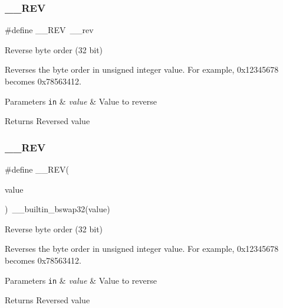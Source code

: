 \subsubsection{\texorpdfstring{\+\_\+\+\_\+\+R\+EV}{\_\_REV}\hspace{0.1cm}{\footnotesize\ttfamily [1/2]}}
{\footnotesize\ttfamily \#define \+\_\+\+\_\+\+R\+EV~\+\_\+\+\_\+rev}



Reverse byte order (32 bit) 

Reverses the byte order in unsigned integer value. For example, 0x12345678 becomes 0x78563412. 
\begin{DoxyParams}[1]{Parameters}
\mbox{\tt in}  & {\em value} & Value to reverse \\
\hline
\end{DoxyParams}
\begin{DoxyReturn}{Returns}
Reversed value 
\end{DoxyReturn}
\mbox{\label{group___c_m_s_i_s___core___instruction_interface_gaca25a02e09983da5558f5242f2f635bc}} 
\subsubsection{\texorpdfstring{\+\_\+\+\_\+\+R\+EV}{\_\_REV}\hspace{0.1cm}{\footnotesize\ttfamily [2/2]}}
{\footnotesize\ttfamily \#define \+\_\+\+\_\+\+R\+EV(\begin{DoxyParamCaption}\item[{}]{value }\end{DoxyParamCaption})~\+\_\+\+\_\+builtin\+\_\+bswap32(value)}



Reverse byte order (32 bit) 

Reverses the byte order in unsigned integer value. For example, 0x12345678 becomes 0x78563412. 
\begin{DoxyParams}[1]{Parameters}
\mbox{\tt in}  & {\em value} & Value to reverse \\
\hline
\end{DoxyParams}
\begin{DoxyReturn}{Returns}
Reversed value 
\end{DoxyReturn}
\mbox{\label{group___c_m_s_i_s___core___instruction_interface_gad35497777af37e7809271b5e6f9510ba}} 
